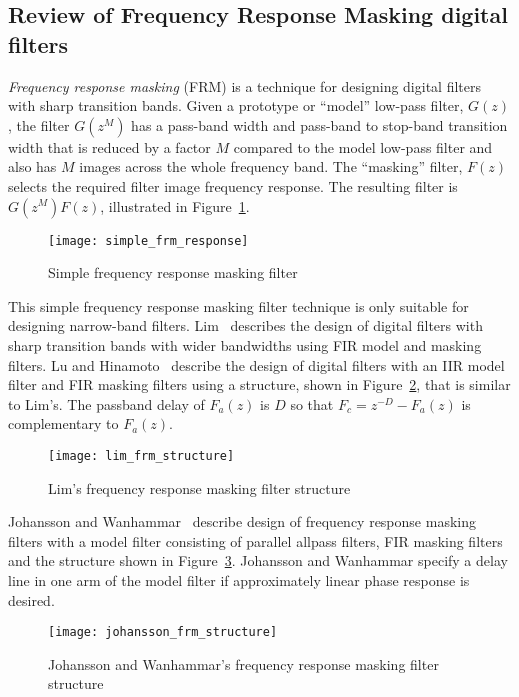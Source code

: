 \documentclass[a4paper,twoside,10pt,english]{report}
\begin{document}
\subsection{\label{sec:Review-FRM-digital-filters}Review of Frequency Response Masking digital filters}
\emph{Frequency response masking} (FRM) is a technique for designing digital 
filters with sharp transition bands. Given a prototype or ``model'' low-pass 
filter, $G\left(z\right)$, the filter $G\left(z^M\right)$ has a pass-band width
and pass-band to stop-band transition width that is reduced by a factor $M$
compared to the model low-pass filter and also has $M$ images across the whole
frequency band. The ``masking'' filter, $F\left(z\right)$ selects the required 
filter image frequency response. The resulting filter is 
$G\left(z^M\right)F\left(z\right)$, illustrated in 
Figure~\ref{fig:Simple-frequency-response-masking-filter}.
\begin{figure}[!htbp]
\begin{center}
\texttt{[image: simple\_frm\_response]}
\caption{Simple frequency response masking filter}
\label{fig:Simple-frequency-response-masking-filter}
\end{center}
\end{figure}
This simple frequency response masking filter technique is only suitable for
designing narrow-band filters.
Lim~\cite{Lim_FrequencyResponseMaskingSharpDigitalFilters} describes the design 
of digital filters with sharp transition bands with wider bandwidths using
FIR model and masking filters.
Lu and Hinamoto~\cite{LuHinamoto_IIRFrequencyMaskingFiltersConeProgramming}
describe the design of digital filters with an IIR model filter and FIR masking
filters using a structure, shown in
Figure~\ref{fig:Lims-frequency-response-masking-filter-structure}, that is
similar to Lim's. The passband delay of $F_{a}\left(z\right)$ is $D$ so that
$F_{c}=z^{-D}-F_{a}\left(z\right)$ is complementary to $F_{a}\left(z\right)$.
\begin{figure}[!htbp]
\begin{center}
\texttt{[image: lim\_frm\_structure]}
\caption{Lim's frequency response masking filter structure}
\label{fig:Lims-frequency-response-masking-filter-structure}
\end{center}
\end{figure}

Johansson and
Wanhammar~\cite{JohanssonWanhammar_RecursiveDigitalFiltersFrequencyMasking}
describe design of frequency response masking filters with a model filter
consisting of parallel allpass filters, FIR masking filters and the structure
shown in 
Figure~\ref{fig:Johansson-and-Wanhammar-frequency-response-masking-structure}.
Johansson and Wanhammar specify a delay line in one arm of the model filter
if approximately linear phase response is desired.
\begin{figure}[!htbp]
\begin{center}
\texttt{[image: johansson\_frm\_structure]}
\caption{Johansson and Wanhammar's frequency response masking filter structure}
\label{fig:Johansson-and-Wanhammar-frequency-response-masking-structure}
\end{center}
\end{figure}
\end{document}
